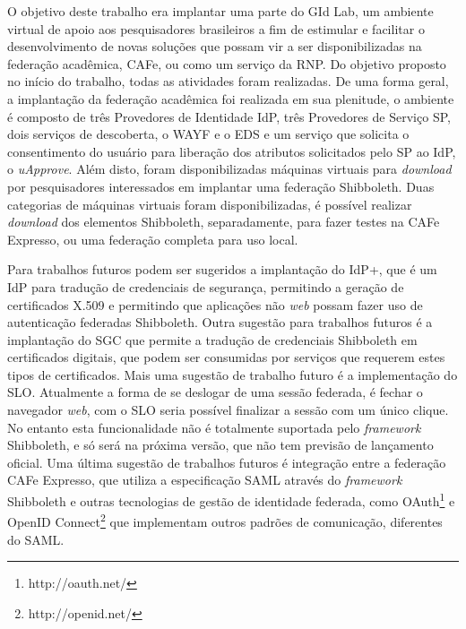 O objetivo deste trabalho era implantar uma parte do GId Lab, um ambiente virtual de apoio aos pesquisadores brasileiros a fim de estimular e facilitar o desenvolvimento de novas soluções que possam vir a ser disponibilizadas na federação acadêmica, CAFe, ou como um serviço da RNP. Do objetivo proposto no início do trabalho, todas as atividades foram realizadas. De uma forma geral, a implantação da federação acadêmica foi realizada em sua plenitude, o ambiente é composto de três Provedores de Identidade \ac{IdP}, três Provedores de Serviço \ac{SP}, dois serviços de descoberta, o \ac{WAYF} e o \ac{EDS} e um serviço que solicita o consentimento do usuário para liberação dos atributos solicitados pelo \ac{SP} ao IdP, o \textit{uApprove}. Além disto, foram disponibilizadas máquinas virtuais para \textit{download} por pesquisadores interessados em implantar uma federação Shibboleth. Duas categorias de máquinas virtuais foram disponibilizadas, é possível realizar \textit{download} dos elementos Shibboleth, separadamente, para fazer testes na CAFe Expresso, ou uma federação completa para uso local.

Para trabalhos futuros podem ser sugeridos a implantação do IdP+, que é um IdP para tradução de credenciais de segurança, permitindo a geração de certificados X.509 e permitindo que aplicações não \textit{web} possam fazer uso de autenticação federadas Shibboleth. Outra sugestão para trabalhos futuros é a implantação do \ac{SGC} que permite a tradução de credenciais Shibboleth em certificados digitais, que podem ser consumidas por serviços que requerem estes tipos de certificados. Mais uma sugestão de trabalho futuro é a implementação do \ac{SLO}. Atualmente a forma de se deslogar de uma sessão federada, é fechar o navegador \textit{web}, com o \ac{SLO} seria possível finalizar a sessão com um único clique. No entanto esta funcionalidade não é totalmente suportada pelo \textit{framework} Shibboleth, e só será na próxima versão, que não tem previsão de lançamento oficial. Uma última sugestão de trabalhos futuros é integração entre a federação CAFe Expresso, que utiliza a especificação SAML através do \textit{framework} Shibboleth e outras tecnologias de gestão de identidade federada, como OAuth\footnote{http://oauth.net/} e OpenID Connect\footnote{http://openid.net/} que implementam outros padrões de comunicação, diferentes do SAML.